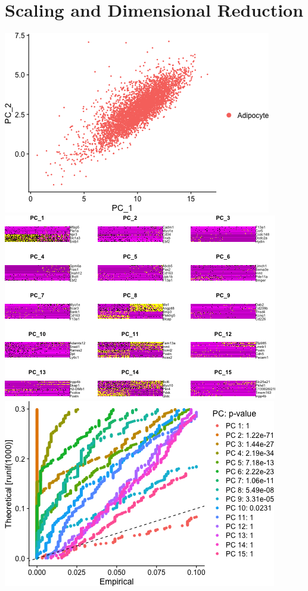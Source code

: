 \documentclass[]{article}
\begin{document}
\hypertarget{scaling-and-dimensional-reduction}{%
\section{Scaling and Dimensional
Reduction}\label{scaling-and-dimensional-reduction}}

\includegraphics{figures/GSE160729-scale-pca-1.png}
\includegraphics{figures/GSE160729-scale-pca-2.png}
\includegraphics{figures/GSE160729-scale-pca-3.png}
\end{document}
